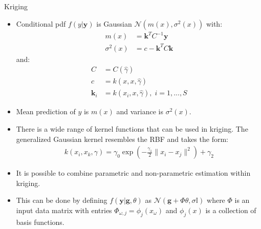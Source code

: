 \documentclass[9pt]{beamer}
\begin{document}
\begin{frame}{Kriging}

\begin{itemize}
   \setlength{\itemsep}{10pt}
\item Conditional pdf $f(y|\mathbf{y})$ is Gaussian $\mathcal{N}(m(x),\sigma^2(x))$ with:
\begin{align*}
m(x)&=\mathbf{k}^TC^{-1}\mathbf{y}\\
\sigma^2(x)&=c-\mathbf{k}^TC\mathbf{k}
\end{align*}
and:
\begin{align*}
C&=C(\hat{\gamma})\\
c&=k(x,x,\hat{\gamma})\\
\mathbf{k}_i&=k(x_i,x,\hat{\gamma}),\; i=1,...,S
\end{align*}
\item Mean prediction of $y$ is $m(x)$ and variance is $\sigma^2(x)$.
\item There is a wide range of kernel functions that can be used in kriging. The generalized Gaussian kernel resembles the RBF and takes the form:
\begin{align*}
k(x_i,x_k,\gamma)=\gamma_0\exp\left(-\frac{\gamma_1}{2}\|x_i-x_j\|^2\right)+\gamma_2
\end{align*}
\item It is possible to combine parametric and non-parametric estimation within kriging. 
\item This can be done by defining $f(\mathbf{y}|\mathbf{g},\theta)$ as $\mathcal{N}(\mathbf{g}+\Phi\theta,\sigma \mathbb{I})$ where $\Phi$ is an input data matrix with entries $\Phi_{\omega,j}=\phi_j(x_\omega)$ and $\phi_j(x)$ is a collection of basis functions. 

\end{itemize}

\end{frame}
\end{document}

